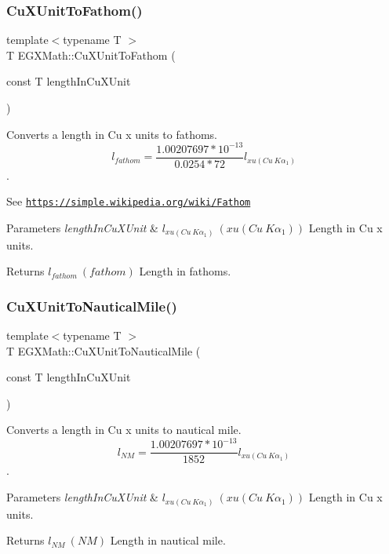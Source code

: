 \subsubsection{\texorpdfstring{Cu\+X\+Unit\+To\+Fathom()}{CuXUnitToFathom()}}
{\footnotesize\ttfamily template$<$typename T $>$ \\
T E\+G\+X\+Math\+::\+Cu\+X\+Unit\+To\+Fathom (\begin{DoxyParamCaption}\item[{const T}]{length\+In\+Cu\+X\+Unit }\end{DoxyParamCaption})}



Converts a length in Cu x units to fathoms. \[ l_{fathom}= \frac{1.00207697*10^{-13}}{0.0254 * 72} l_{xu(Cu\ K\alpha_1)} \]. 

See \href{https://simple.wikipedia.org/wiki/Fathom}{\tt https\+://simple.\+wikipedia.\+org/wiki/\+Fathom} 
\begin{DoxyParams}{Parameters}
{\em length\+In\+Cu\+X\+Unit} & $ l_{xu(Cu\ K\alpha_1)}\ (xu(Cu\ K\alpha_1))$ Length in Cu x units. \\
\hline
\end{DoxyParams}
\begin{DoxyReturn}{Returns}
$ l_{fathom}\ (fathom)$ Length in fathoms. 
\end{DoxyReturn}
\mbox{\label{group___e_g_x_math-_conversions-_length_conversions-_non-_s_i-_cu_x_unit-_nautical_gaaa51a984890efeec739a702b982fad57}} 
\subsubsection{\texorpdfstring{Cu\+X\+Unit\+To\+Nautical\+Mile()}{CuXUnitToNauticalMile()}}
{\footnotesize\ttfamily template$<$typename T $>$ \\
T E\+G\+X\+Math\+::\+Cu\+X\+Unit\+To\+Nautical\+Mile (\begin{DoxyParamCaption}\item[{const T}]{length\+In\+Cu\+X\+Unit }\end{DoxyParamCaption})}



Converts a length in Cu x units to nautical mile. \[ l_{NM}= \frac{1.00207697*10^{-13}}{1852} l_{xu(Cu\ K\alpha_1)} \]. 


\begin{DoxyParams}{Parameters}
{\em length\+In\+Cu\+X\+Unit} & $ l_{xu(Cu\ K\alpha_1)}\ (xu(Cu\ K\alpha_1))$ Length in Cu x units. \\
\hline
\end{DoxyParams}
\begin{DoxyReturn}{Returns}
$ l_{NM}\ (NM)$ Length in nautical mile. 
\end{DoxyReturn}
